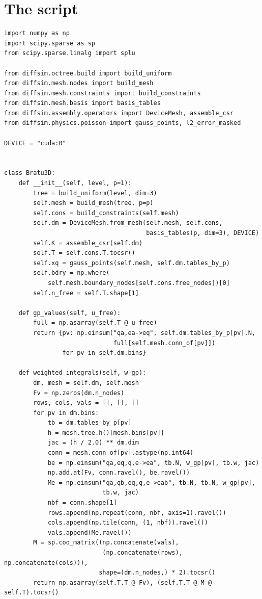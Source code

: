 \section*{The script}
\begin{lstlisting}
import numpy as np
import scipy.sparse as sp
from scipy.sparse.linalg import splu

from diffsim.octree.build import build_uniform
from diffsim.mesh.nodes import build_mesh
from diffsim.mesh.constraints import build_constraints
from diffsim.mesh.basis import basis_tables
from diffsim.assembly.operators import DeviceMesh, assemble_csr
from diffsim.physics.poisson import gauss_points, l2_error_masked

DEVICE = "cuda:0"


class Bratu3D:
    def __init__(self, level, p=1):
        tree = build_uniform(level, dim=3)
        self.mesh = build_mesh(tree, p=p)
        self.cons = build_constraints(self.mesh)
        self.dm = DeviceMesh.from_mesh(self.mesh, self.cons,
                                       basis_tables(p, dim=3), DEVICE)
        self.K = assemble_csr(self.dm)
        self.T = self.cons.T.tocsr()
        self.xq = gauss_points(self.mesh, self.dm.tables_by_p)
        self.bdry = np.where(
            self.mesh.boundary_nodes[self.cons.free_nodes])[0]
        self.n_free = self.T.shape[1]

    def gp_values(self, u_free):
        full = np.asarray(self.T @ u_free)
        return {pv: np.einsum("qa,ea->eq", self.dm.tables_by_p[pv].N,
                              full[self.mesh.conn_of[pv]])
                for pv in self.dm.bins}

    def weighted_integrals(self, w_gp):
        dm, mesh = self.dm, self.mesh
        Fv = np.zeros(dm.n_nodes)
        rows, cols, vals = [], [], []
        for pv in dm.bins:
            tb = dm.tables_by_p[pv]
            h = mesh.tree.h()[mesh.bins[pv]]
            jac = (h / 2.0) ** dm.dim
            conn = mesh.conn_of[pv].astype(np.int64)
            be = np.einsum("qa,eq,q,e->ea", tb.N, w_gp[pv], tb.w, jac)
            np.add.at(Fv, conn.ravel(), be.ravel())
            Me = np.einsum("qa,qb,eq,q,e->eab", tb.N, tb.N, w_gp[pv],
                           tb.w, jac)
            nbf = conn.shape[1]
            rows.append(np.repeat(conn, nbf, axis=1).ravel())
            cols.append(np.tile(conn, (1, nbf)).ravel())
            vals.append(Me.ravel())
        M = sp.coo_matrix((np.concatenate(vals),
                           (np.concatenate(rows), np.concatenate(cols))),
                          shape=(dm.n_nodes,) * 2).tocsr()
        return np.asarray(self.T.T @ Fv), (self.T.T @ M @ self.T).tocsr()


\end{lstlisting}
